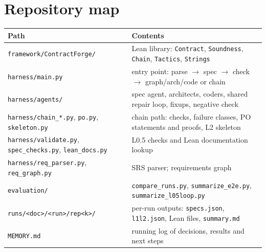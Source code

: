 \documentclass[11pt,a4paper]{article}
\newcommand{\file}[1]{\texttt{#1}}
\begin{document}
\section{Repository map}
\small
\begin{tabularx}{\linewidth}{l L}
\toprule
Path & Contents \\
\midrule
\file{framework/ContractForge/} & Lean library: \file{Contract}, \file{Soundness}, \file{Chain}, \file{Tactics}, \file{Strings} \\
\file{harness/main.py} & entry point: parse $\to$ spec $\to$ check $\to$ graph/arch/code or chain \\
\file{harness/agents/} & spec agent, architects, coders, shared repair loop, fixups, negative check \\
\file{harness/chain\_*.py}, \file{po.py}, \file{skeleton.py} & chain path: checks, failure classes, PO statements and proofs, L2 skeleton \\
\file{harness/validate.py}, \file{spec\_checks.py}, \file{lean\_docs.py} & L0.5 checks and Lean documentation lookup \\
\file{harness/req\_parser.py}, \file{req\_graph.py} & SRS parser; requirements graph \\
\file{evaluation/} & \file{compare\_runs.py}, \file{summarize\_e2e.py}, \file{summarize\_l05loop.py} \\
\file{runs/<doc>/<run>/rep<k>/} & per-run outputs: \file{specs.json}, \file{l1l2.json}, Lean files, \file{summary.md} \\
\file{MEMORY.md} & running log of decisions, results and next steps \\
\bottomrule
\end{tabularx}
\end{document}
